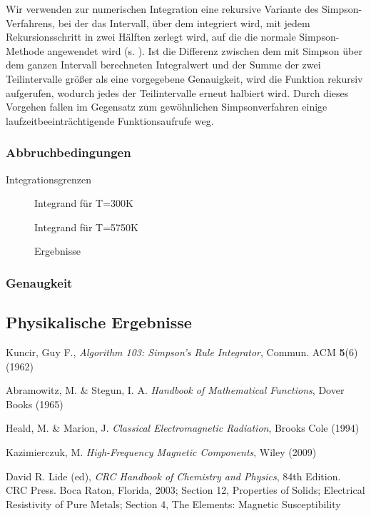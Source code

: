 \documentclass[10pt,a4paper]{article}
\begin{document}
Wir verwenden zur numerischen Integration eine rekursive Variante des Simpson-Verfahrens, bei der das Intervall, über dem integriert wird, mit jedem Rekursionsschritt in zwei Hälften zerlegt wird, auf die die normale Simpson-Methode angewendet wird (s. \cite{kuncir}). Ist die Differenz zwischen dem mit Simpson über dem ganzen Intervall berechneten Integralwert und der Summe der zwei Teilintervalle größer als eine vorgegebene Genauigkeit, wird die Funktion rekursiv aufgerufen, wodurch jedes der Teilintervalle erneut halbiert wird. Durch dieses Vorgehen fallen im Gegensatz zum gewöhnlichen Simpsonverfahren einige laufzeitbeeinträchtigende Funktionsaufrufe weg.

\subsubsection{Abbruchbedingungen}

Integrationsgrenzen
\begin{figure}[htbp]
\centering

\caption{Integrand für T=300K}
\end{figure}

\begin{figure}[htbp]
\centering

\caption{Integrand für T=5750K}


\caption{Ergebnisse}
\end{figure}

\subsubsection{Genaugkeit}

\subsection{Physikalische Ergebnisse}
\label{ssec:physikalischeergebnisse}

\begin{thebibliography}{9}

 Kuncir, Guy F.,
 \emph{Algorithm 103: Simpson's Rule Integrator},
 Commun. ACM \textbf{5}(6) (1962)


Abramowitz, M. \& Stegun, I. A.
\emph{Handbook of Mathematical Functions},
Dover Books (1965)

Heald, M. \& Marion, J.
\emph{Classical Electromagnetic Radiation},
Brooks Cole (1994)

Kazimierczuk, M.
\emph{High-Frequency Magnetic Components},
Wiley (2009)

David R. Lide (ed),
\emph{CRC Handbook of Chemistry and Physics},
84th Edition. CRC Press. Boca Raton, Florida, 2003;
Section 12, Properties of Solids; Electrical Resistivity of Pure Metals;
Section 4, The Elements: Magnetic Susceptibility

\end{thebibliography}
\end{document}
